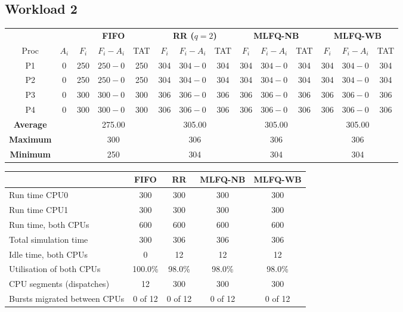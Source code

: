 \documentclass[11pt,a4paper]{article}
\begin{document}
\subsection{Workload 2}
\begin{center}\footnotesize\setlength{\tabcolsep}{4pt}
\begin{tabular}{cccccccccccccc}\toprule
& & \multicolumn{3}{c}{\textbf{FIFO}} & \multicolumn{3}{c}{\textbf{RR ($q=2$)}} & \multicolumn{3}{c}{\textbf{MLFQ-NB}} & \multicolumn{3}{c}{\textbf{MLFQ-WB}} \\
\cmidrule(lr){3-5}\cmidrule(lr){6-8}\cmidrule(lr){9-11}\cmidrule(lr){12-14}
Proc & $A_i$ & $F_i$ & $F_i-A_i$ & TAT & $F_i$ & $F_i-A_i$ & TAT & $F_i$ & $F_i-A_i$ & TAT & $F_i$ & $F_i-A_i$ & TAT \\\midrule
P1 & 0 & 250 & $250-0$ & 250 & 304 & $304-0$ & 304 & 304 & $304-0$ & 304 & 304 & $304-0$ & 304 \\
P2 & 0 & 250 & $250-0$ & 250 & 304 & $304-0$ & 304 & 304 & $304-0$ & 304 & 304 & $304-0$ & 304 \\
P3 & 0 & 300 & $300-0$ & 300 & 306 & $306-0$ & 306 & 306 & $306-0$ & 306 & 306 & $306-0$ & 306 \\
P4 & 0 & 300 & $300-0$ & 300 & 306 & $306-0$ & 306 & 306 & $306-0$ & 306 & 306 & $306-0$ & 306 \\
\midrule
\textbf{Average} & & \multicolumn{3}{c}{275.00} & \multicolumn{3}{c}{305.00} & \multicolumn{3}{c}{305.00} & \multicolumn{3}{c}{305.00} \\
\textbf{Maximum} & & \multicolumn{3}{c}{300} & \multicolumn{3}{c}{306} & \multicolumn{3}{c}{306} & \multicolumn{3}{c}{306} \\
\textbf{Minimum} & & \multicolumn{3}{c}{250} & \multicolumn{3}{c}{304} & \multicolumn{3}{c}{304} & \multicolumn{3}{c}{304} \\
\bottomrule\end{tabular}\end{center}
\begin{center}\footnotesize\begin{tabular}{lcccc}\toprule
& \textbf{FIFO} & \textbf{RR} & \textbf{MLFQ-NB} & \textbf{MLFQ-WB}\\\midrule
Run time CPU0 & 300 & 300 & 300 & 300 \\
Run time CPU1 & 300 & 300 & 300 & 300 \\
Run time, both CPUs & 600 & 600 & 600 & 600 \\
Total simulation time & 300 & 306 & 306 & 306 \\
Idle time, both CPUs & 0 & 12 & 12 & 12 \\
Utilisation of both CPUs & 100.0\% & 98.0\% & 98.0\% & 98.0\% \\
CPU segments (dispatches) & 12 & 300 & 300 & 300 \\
Bursts migrated between CPUs & 0 of 12 & 0 of 12 & 0 of 12 & 0 of 12 \\
\bottomrule\end{tabular}\end{center}
\end{document}
